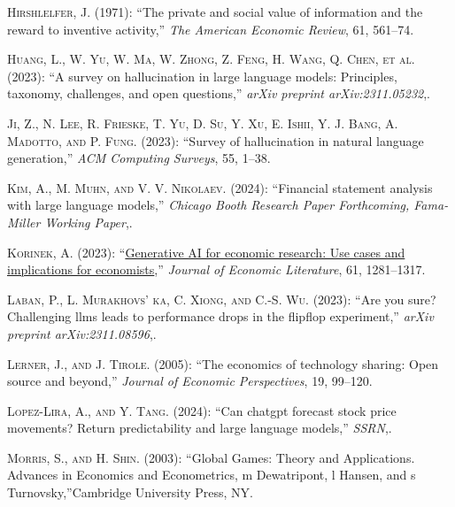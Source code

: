 \documentclass[
]{article}
\newlength{\cslhangindent}
\newlength{\cslentryspacingunit} %
\newenvironment{CSLReferences}[2] %
 {%
  \setlength{\parindent}{0pt}
  \ifodd #1
  \let\oldpar\par
  \def\par{\hangindent=\cslhangindent\oldpar}
  \fi
  \setlength{\parskip}{#2\cslentryspacingunit}
 }%
 {}
\theoremstyle{plain}
\theoremstyle{definition}
\theoremstyle{remark}
\begin{document}
\begin{CSLReferences}{1}{0}
\leavevmode{}%
\textsc{Hirshlelfer, J.} (1971): {``The private and social value of
information and the reward to inventive activity,''} \emph{The American
Economic Review}, 61, 561--74.

\leavevmode{}%
\textsc{Huang, L., W. Yu, W. Ma, W. Zhong, Z. Feng, H. Wang, Q. Chen, et
al.} (2023): {``A survey on hallucination in large language models:
Principles, taxonomy, challenges, and open questions,''} \emph{arXiv
preprint arXiv:2311.05232},.

\leavevmode{}%
\textsc{Ji, Z., N. Lee, R. Frieske, T. Yu, D. Su, Y. Xu, E. Ishii, Y. J.
Bang, A. Madotto, and P. Fung}. (2023): {``Survey of hallucination in
natural language generation,''} \emph{ACM Computing Surveys}, 55, 1--38.

\leavevmode{}%
\textsc{Kim, A., M. Muhn, and V. V. Nikolaev}. (2024): {``Financial
statement analysis with large language models,''} \emph{Chicago Booth
Research Paper Forthcoming, Fama-Miller Working Paper},.

\leavevmode{}%
\textsc{Korinek, A.} (2023):
{``\href{https://doi.org/10.1257/jel.20231736}{Generative AI for
economic research: Use cases and implications for economists},''}
\emph{Journal of Economic Literature}, 61, 1281--1317.

\leavevmode{}%
\textsc{Laban, P., L. Murakhovs' ka, C. Xiong, and C.-S. Wu}. (2023):
{``Are you sure? Challenging llms leads to performance drops in the
flipflop experiment,''} \emph{arXiv preprint arXiv:2311.08596},.

\leavevmode{}%
\textsc{Lerner, J., and J. Tirole}. (2005): {``The economics of
technology sharing: Open source and beyond,''} \emph{Journal of Economic
Perspectives}, 19, 99--120.

\leavevmode{}%
\textsc{Lopez-Lira, A., and Y. Tang}. (2024): {``Can chatgpt forecast
stock price movements? Return predictability and large language
models,''} \emph{SSRN},.

\leavevmode{}%
\textsc{Morris, S., and H. Shin}. (2003): {``Global Games: Theory and
Applications. Advances in Economics and Econometrics, m Dewatripont, l
Hansen, and s Turnovsky,''}Cambridge University Press, NY.


\end{CSLReferences}
\end{document}
